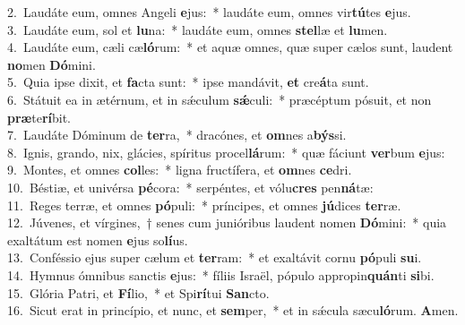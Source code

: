 {2.~}Laudáte eum, omnes Angeli \textbf{e}jus:~* laudáte eum, omnes vir\textbf{tú}tes \textbf{e}jus.\\
{3.~}Laudáte eum, sol et \textbf{lu}na:~* laudáte eum, omnes \textbf{stel}læ et \textbf{lu}men.\\
{4.~}Laudáte eum, cæli cæ\textbf{ló}rum:~* et aquæ omnes, quæ super cælos sunt, laudent \textbf{no}men \textbf{Dó}mini.\\
{5.~}Quia ipse dixit, et \textbf{fa}cta sunt:~* ipse mandávit, \textbf{et} cre\textbf{á}ta sunt.\\
{6.~}Státuit ea in ætérnum, et in sǽculum \textbf{sǽ}culi:~* præcéptum pósuit, et non \textbf{præ}te\textbf{rí}bit.\\
{7.~}Laudáte Dóminum de \textbf{ter}ra,~* dracónes, et \textbf{om}nes a\textbf{býs}si.\\
{8.~}Ignis, grando, nix, glácies, spíritus procel\textbf{lá}rum:~* quæ fáciunt \textbf{ver}bum \textbf{e}jus:\\
{9.~}Montes, et omnes \textbf{col}les:~* ligna fructífera, et \textbf{om}nes \textbf{ce}dri.\\
{10.~}Béstiæ, et univérsa \textbf{pé}cora:~* serpéntes, et vólu\textbf{cres} pen\textbf{ná}tæ:\\
{11.~}Reges terræ, et omnes \textbf{pó}puli:~* príncipes, et omnes \textbf{jú}dices \textbf{ter}ræ.\\
{12.~}Júvenes, et vírgines,~† senes cum junióribus laudent nomen \textbf{Dó}mini:~* quia exaltátum est nomen \textbf{e}jus so\textbf{lí}us.\\
{13.~}Conféssio ejus super cælum et \textbf{ter}ram:~* et exaltávit cornu \textbf{pó}puli \textbf{su}i.\\
{14.~}Hymnus ómnibus sanctis \textbf{e}jus:~* fíliis Israël, pópulo appropin\textbf{quán}ti \textbf{si}bi.\\
{15.~}Glória Patri, et \textbf{Fí}lio,~* et Spi\textbf{rí}tui \textbf{San}cto.\\
{16.~}Sicut erat in princípio, et nunc, et \textbf{sem}per,~* et in sǽcula sæcu\textbf{ló}rum. \textbf{A}men.\\
